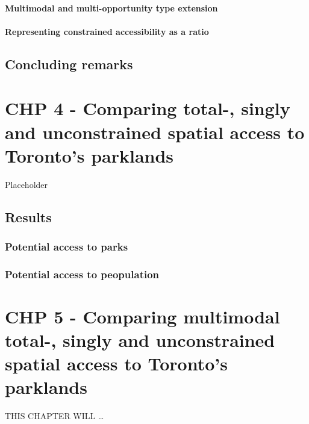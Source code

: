 \documentclass[
11pt, %
oneside, %
english, %
singlespacing, %
]{macthesis} %
\begin{document}
\subsubsection{Multimodal and multi-opportunity type extension}\label{multimodal-and-multi-opportunity-type-extension}

\subsubsection{Representing constrained accessibility as a ratio}\label{representing-constrained-accessibility-as-a-ratio}

\section{Concluding remarks}\label{concluding-remarks}

\chapter{CHP 4 - Comparing total-, singly and unconstrained spatial access to Toronto's parklands}\label{chp-4---comparing-total--singly-and-unconstrained-spatial-access-to-torontos-parklands}

Placeholder

\section{Results}\label{results}

\subsection{Potential access to parks}\label{potential-access-to-parks}

\subsection{Potential access to peopulation}\label{potential-access-to-peopulation}

\chapter{CHP 5 - Comparing multimodal total-, singly and unconstrained spatial access to Toronto's parklands}\label{chp-5---comparing-multimodal-total--singly-and-unconstrained-spatial-access-to-torontos-parklands}

THIS CHAPTER WILL \ldots{}
\end{document}
